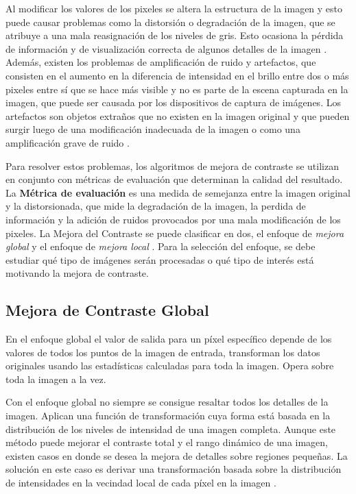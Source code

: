 Al modificar los valores de los pixeles se altera la estructura de la imagen y esto puede causar problemas como la distorsión o degradación de la imagen, que se atribuye a una mala reasignación de los niveles de gris. Esto ocasiona la pérdida de información y de visualización correcta de algunos detalles de la imagen \cite{kwok2013}. Además, existen los problemas de amplificación de ruido y artefactos, que consisten en el aumento en la diferencia de intensidad en el brillo entre dos o más pixeles entre sí que se hace más visible y no es parte de la escena capturada en la imagen, que puede ser causada por los dispositivos de captura de imágenes. Los artefactos son objetos extraños que no existen en la imagen original y que pueden surgir luego de una modificación inadecuada de la imagen o como una amplificación grave de ruido \cite{kwok2013}.

Para resolver estos problemas, los algoritmos de mejora de contraste se utilizan en conjunto con métricas de evaluación que determinan la calidad del resultado. La \textbf{Métrica de evaluación} es una medida de semejanza entre la imagen original y la distorsionada, que mide la degradación de la imagen, la perdida de información y la adición de ruidos provocados por una mala modificación de los pixeles.
La Mejora del Contraste se puede clasificar en dos, el enfoque de \textit{mejora global} y el enfoque de \textit{mejora local} \cite{morebrizuela2014}. Para la selección del enfoque, se debe estudiar qué tipo de imágenes serán procesadas o qué tipo de interés está motivando la mejora de contraste.

\subsection{Mejora de Contraste Global}

En el enfoque global el valor de salida para un píxel específico depende de los valores de todos los puntos de la imagen de entrada, transforman los datos originales usando las estadísticas calculadas para toda la imagen. Opera sobre toda la imagen a la vez.

Con el enfoque global no siempre se consigue resaltar todos los detalles de la imagen. Aplican una función de transformación cuya forma está basada en la distribución de los niveles de intensidad de una imagen completa. Aunque este método puede mejorar el contraste total y el rango dinámico de una imagen, existen casos en donde se desea la mejora de detalles sobre regiones pequeñas. La solución en este caso es derivar una transformación basada sobre la distribución de intensidades en la vecindad local de cada píxel en la imagen \cite{procesamientoimagen}.


